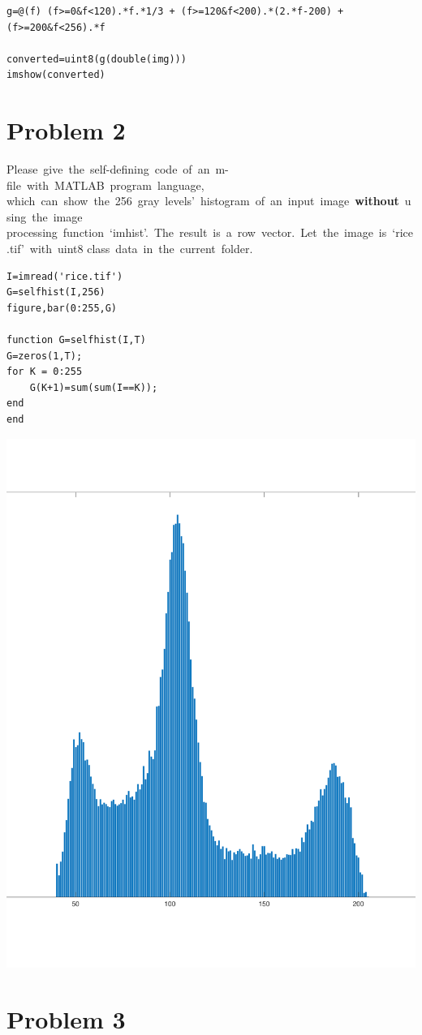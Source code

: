 \documentclass{article}
\begin{document}
\begin{CJK}{UTF8}{gbsn}
\begin{lstlisting}
g=@(f) (f>=0&f<120).*f.*1/3 + (f>=120&f<200).*(2.*f-200) + (f>=200&f<256).*f

converted=uint8(g(double(img)))
imshow(converted)

\end{lstlisting}

\section{Problem 2}

Please give the self-defining code of an m-file with MATLAB program language,  which can show the 256 gray levels’ histogram of an input image \textbf{without} using the image processing function ‘imhist’. The result is a row vector. Let the image is ‘rice.tif’ with uint8 class data in the current folder.

\begin{lstlisting}
I=imread('rice.tif')
G=selfhist(I,256)
figure,bar(0:255,G)

function G=selfhist(I,T)
G=zeros(1,T);
for K = 0:255
    G(K+1)=sum(sum(I==K));
end
end
\end{lstlisting}

{\centering
\includegraphics[width=1.0\textwidth,height=0.9\textwidth]{selfhist.pdf}}


\section{Problem 3}


\end{CJK}
\end{document}
